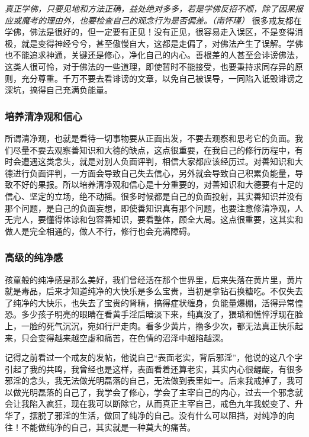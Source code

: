 \textit{真正学佛，只要见地和方法正确，益处绝对多多，若是学佛反招不顺，除了因果报应或魔考的理由外，也要检查自己的观念行为是否偏差。（南怀瑾）} 很多戒友都在学佛，佛法是很好的，但一定要有正见！没有正见，很容易走入误区，不是变得消极，就是变得神经兮兮，甚至傲慢自大，这都是走偏了，对佛法产生了误解。学佛也不能追求神通，关键还是修心，净化自己的内心。善根差的人甚至会诽谤佛法，这类人很可怜，对于佛法的一些道理，即使暂时不能接受，也要秉持求同存异的原则，充分尊重。千万不要去看诽谤的文章，以免自己被误导，一同陷入诋毁诽谤之深坑，搞得自己充满负能量。

\subsubsection{培养清净观和信心}

所谓清净观，也就是看待一切事物要从正面出发，不要去观察和思考它的负面。我们尽量不要去观察善知识和大德的缺点，这点很重要，在我自己的修行历程中，有时会遭遇这类念头，就是对别人负面评判，相信大家都应该经历过。对善知识和大德进行负面评判，一方面会导致自己失去信心，另外就会导致自己积累负能量，导致不好的果报。所以培养清净观和信心是十分重要的，对善知识和大德要有十足的信心、坚定的立场，绝不动摇。很多时候都是自己的负面投射，其实善知识并没有那个问题，是自己的负面妄想，即使善知识真有那个问题，也要注意修清净观，人无完人，要懂得体谅和包容善知识，要看整体，顾全大局。这点很重要，这其实和做人是完全相通的，做人不行，修行也会充满障碍。

\subsubsection{高级的纯净感}

孩童般的纯净感是那么美好，我们曾经活在那个世界里，后来失落在黄片里，黄片就是毒品，后来才知道纯净的大快乐是多么宝贵，当初是拿钻石换糖吃。不仅失去了纯净的大快乐，也失去了宝贵的肾精，搞得症状缠身，负能量爆棚，活得异常惶恐。多少孩子明亮的眼睛在看黄手淫后暗淡下来，纯真没了，猥琐和憔悴浮现在脸上，一脸的死气沉沉，宛如行尸走肉。看多少黄片，撸多少次，都无法真正快乐起来，只会变得越来越空虚和痛苦，在色情的沼泽中越陷越深。

记得之前看过一个戒友的发帖，他说自己“表面老实，背后邪淫”，他说的这八个字引起了我的共鸣，我曾经也是这样，表面看着还算老实，其实内心很龌龊，有很多邪淫的念头，我无法做光明磊落的自己，无法做到表里如一。后来我戒掉了，我可以做光明磊落的自己了，我学会了修心，学会了主宰自己的内心，过去一个邪念就会让我陷入疯狂，现在我可以断除它，从而真正主宰自己，戒色九年我蜕变了、升华了，摆脱了邪淫的生活，做回了纯净的自己。没有什么可以阻挡，对纯净的向往！不能做纯净的自己，其实就是一种莫大的痛苦。

